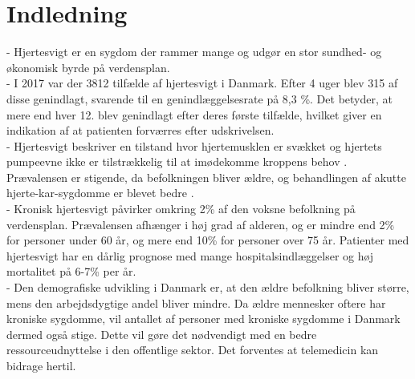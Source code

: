 \chapter{Indledning}\label{indledningen}

- Hjertesvigt er en sygdom der rammer mange og udgør en stor sundhed- og økonomisk byrde på verdensplan.\\
- I 2017 var der 3812 tilfælde af hjertesvigt i Danmark. Efter 4 uger blev 315 af disse genindlagt, svarende til en genindlæggelsesrate på 8,3 \%. Det betyder, at mere end hver 12. blev genindlagt efter deres første tilfælde, hvilket giver en indikation af at patienten forværres efter udskrivelsen.\\

- Hjertesvigt beskriver en tilstand hvor hjertemusklen er svækket og hjertets pumpeevne ikke er tilstrækkelig til at imødekomme kroppens behov \citep{TSchroeder2016}. Prævalensen er stigende, da befolkningen bliver ældre, og behandlingen af akutte hjerte-kar-sygdomme er blevet bedre \citep{heartfailure,Gheorghiade2009}.\\

- Kronisk hjertesvigt påvirker omkring 2\% af den voksne befolkning på verdensplan. Prævalensen afhænger i høj grad af alderen, og er mindre end 2\% for personer under 60 år, og mere end 10\% for personer over 75 år. Patienter med hjertesvigt har en dårlig prognose med mange hospitalsindlæggelser og høj mortalitet på 6-7\% per år. \citep{heartfailure}\\

- Den demografiske udvikling i Danmark er, at den ældre befolkning bliver større, mens den arbejdsdygtige andel bliver mindre. Da ældre mennesker oftere har kroniske sygdomme, vil antallet af personer med kroniske sygdomme i Danmark dermed også stige. Dette vil gøre det nødvendigt med en bedre ressourceudnyttelse i den offentlige sektor. Det forventes at telemedicin kan bidrage hertil. \citep{erfaringsopsamlingTelemedicin}\\